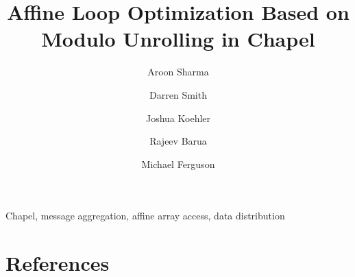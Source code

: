 \documentclass[review]{elsarticle}
\begin{document}
\begin{frontmatter}

\title{Affine Loop Optimization Based on Modulo Unrolling in Chapel}

\author[umd]{Aroon Sharma}
\author[umd]{Darren Smith}
\author[umd]{Joshua Koehler}
\author[umd]{Rajeev Barua}
\author[lts]{Michael Ferguson}
\address[umd]{Universtiy of Maryland Department of Electrical and Computer Engineering, College Park, MD}
\address[lts]{Laboratory for Telecommunication Sciences, College Park, MD}





\begin{keyword}
Chapel, message aggregation, affine array access, data distribution
\end{keyword}

\end{frontmatter}











\section{References}

\end{document}
